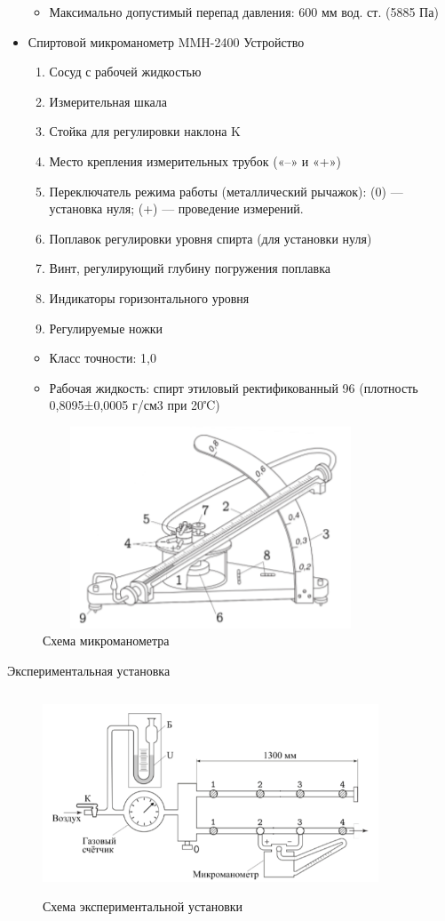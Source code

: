 \documentclass[12pt,a4paper]{article}
\begin{document}
\begin{itemize}
\begin{itemize}
\item Максимально допустимый перепад давления: 600 мм вод. ст. (5885 Па)
\end{itemize}
\item Спиртовой микроманометр MMH-2400
Устройство
\begin{enumerate}
\item Сосуд с рабочей жидкостью
\item Измерительная шкала
\item Стойка для регулировки наклона K
\item Место крепления измерительных
трубок («–» и «+»)
\item Переключатель режима работы
(металлический рычажок):
(0) — установка нуля;
(+) — проведение измерений.
\item Поплавок регулировки уровня спирта (для установки нуля)
\item Винт, регулирующий глубину погружения поплавка
\item Индикаторы горизонтального уровня
\item Регулируемые ножки
\end{enumerate}
\begin{itemize}
\item Класс точности: 1,0
\item Рабочая жидкость: спирт этиловый ректификованный 96%
 (плотность 0,8095±0,0005 г/см3 при 20℃)
\end{itemize}
\end{itemize}
\begin{figure}[H]
\centering
\includegraphics[width=10cm, height=6cm]{1.3.3_2}
\caption{Схема микроманометра}
\label{pic:1}
\end{figure}
\newpage
\begin{center}
\large{Экспериментальная установка}
\end{center}
\begin{figure}[H]
\centering
\includegraphics[width=10cm, height=6cm]{1.3.3_3}
\caption{Схема экспериментальной установки}
\label{pic:2}
\end{figure}
\end{document}
